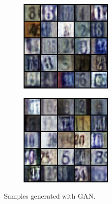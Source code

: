 \begin{itemize}
\begin{enumerate}
	
	\begin{figure}[H]
		\centering
		\begin{subfigure}[b]{0.4\linewidth}
			\includegraphics[scale=1]{Q3gansample.png}
		\end{subfigure}
		\begin{subfigure}[b]{0.4\linewidth}
			\includegraphics[scale=1]{Q3gansample2.png}
		\end{subfigure}
		\caption{Samples generated with GAN.}
		\label{fig:q3gan}
	\end{figure}


\end{enumerate}
\end{itemize}
